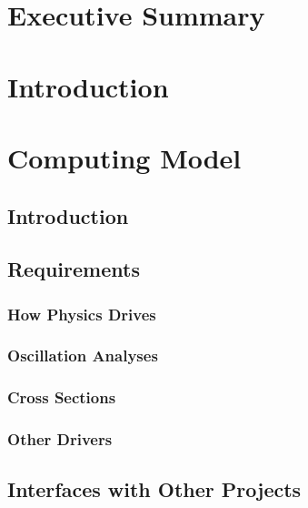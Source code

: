 \section{Executive Summary}		
\label{ch:exec-comp-es}

\section{Introduction}		
\label{ch:exec-comp-int}
\section{Computing Model}		
\label{ch:exec-comp-mod}

\subsection{Introduction}	
\label{ch:exec-comp-mod-int}


\subsection{Requirements}	
\label{ch:exec-comp-mod-req}


\subsubsection{How Physics Drives}
\label{ch:exec-comp-mod-req-phys-drv}


\subsubsection{Oscillation Analyses}
\label{ch:exec-comp-mod-req-osc}


\subsubsection{Cross Sections}
\label{ch:exec-comp-mod-req-xsec}


\subsubsection{Other Drivers}
\label{ch:exec-comp-mod-req-oth-drv}


\subsection{Interfaces with Other Projects}	
\label{ch:exec-comp-mod-intfc}


